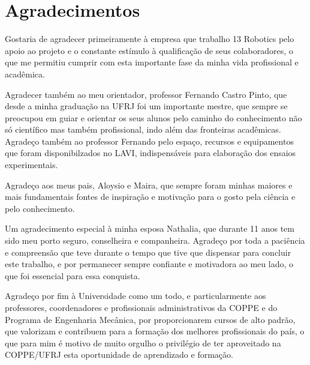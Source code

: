 \chapter*{Agradecimentos}


Gostaria de agradecer primeiramente à empresa que trabalho 13 Robotics pelo
apoio ao projeto e o constante estímulo à qualificação de seus colaboradores,
o que me permitiu cumprir com esta importante fase da minha vida profissional e
acadêmica.

Agradecer também ao meu orientador, professor Fernando Castro Pinto, que desde a
minha graduação na UFRJ foi um importante mestre, que sempre se preocupou em
guiar e orientar os seus alunos pelo caminho do conhecimento não só científico
mas também profissional, indo além das fronteiras acadêmicas. Agradeço também ao
professor Fernando pelo espaço, recursos e equipamentos que foram
disponibilzados no LAVI, indispensáveis para elaboração dos ensaios
experimentais.

Agradeço aos meus pais, Aloysio e Maira, que sempre foram minhas maiores e mais
fundamentais fontes de inspiração e motivação para o gosto pela ciência e pelo
conhecimento.

Um agradecimento especial à minha esposa Nathalia, que durante 11 anos tem sido
meu porto seguro, conselheira e companheira.
Agradeço por toda a paciência e compreensão que teve durante o tempo que tive
que dispensar para concluir este trabalho, e por permanecer sempre confiante e
motivadora ao meu lado, o que foi essencial para essa conquista.

Agradeço por fim à Universidade como um todo, e particularmente aos professores,
coordenadores e profissionais administrativos da COPPE e do Programa de
Engenharia Mecânica, por proporcionarem cursos de alto padrão, que valorizam e
contribuem para a formação dos melhores profissionais do país, o que para mim é
motivo de muito orgulho o privilégio de ter aproveitado na COPPE/UFRJ esta
oportunidade de aprendizado e formação.

